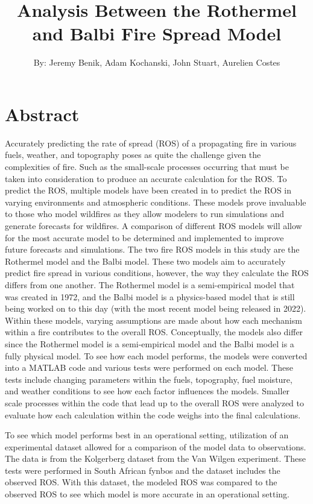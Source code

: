 \documentclass{article}
\begin{document}
\title{Analysis Between the Rothermel and Balbi Fire Spread Model}
\author{By: Jeremy Benik, Adam Kochanski, John Stuart, Aurelien Costes}
\maketitle
\section{Abstract}
Accurately predicting the rate of spread (ROS) of a propagating fire in various fuels, weather, and topography poses as quite the challenge given the complexities of fire. Such as the small-scale processes occurring that must be taken into consideration to produce an accurate calculation for the ROS. To predict the ROS, multiple models have been created in to predict the ROS in varying environments and atmospheric conditions.
These models prove invaluable to those who model wildfires as they allow modelers to run simulations and generate forecasts for wildfires. A comparison of different ROS models will allow for the most accurate model to be determined and implemented to improve future forecasts and simulations. The two fire ROS models in this study are the Rothermel model and the Balbi model. These two models aim to accurately predict fire spread in various conditions, however, the way they calculate the ROS differs from one another. The Rothermel model is a semi-empirical model that was created in 1972, and the Balbi model is a physics-based model that is still being worked on to this day (with the most recent model being released in 2022). Within these models, varying assumptions are made about how each mechanism within a fire contributes to the overall ROS. Conceptually, the models also differ since the Rothermel model is a semi-empirical model and the Balbi model is a fully physical model. To see how each model performs, the models were converted into a MATLAB code and various tests were performed on each model. These tests include changing parameters within the fuels, topography, fuel moisture, and weather conditions to see how each factor influences the models. Smaller scale processes within the code that lead up to the overall ROS were analyzed to evaluate how each calculation within the code weighs into the final calculations.

To see which model performs best in an operational setting, utilization of an experimental dataset allowed for a comparison of the model data to observations. The data is from the Kolgerberg dataset from the Van Wilgen experiment. These tests were performed in South African fynbos and the dataset includes the observed ROS. With this dataset, the modeled ROS was compared to the observed ROS to see which model is more accurate in an operational setting.
\end{document}
